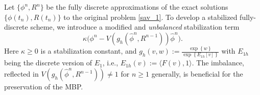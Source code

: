 \documentclass{m2an}
\begin{document}
Let $ \{ \phi^n, R^n \} $ be the fully discrete approximations of the exact solutions $ \{ \phi( t_{n} ), R( t_n ) \} $ to the original problem \eqref{sav_1}. To develop a stabilized fully-discrete scheme, we introduce a modified and \textit{unbalanced} stabilization term
\begin{equation}\label{def:ST}
	\kappa \big( \phi^{n} - V ( g_h(\hat{\phi}^{n}, R^{n-1}) ) \hat{\phi}^{n} \big).
\end{equation}
Here $ \kappa \geq 0 $ is a stabilization constant, and $ g_h(v, w):= \frac{\exp \left\{w\right\}}{ \exp \left\{E_{1h}[v]\right\} } $ with $E_{1 h}$ being the discrete version of $E_1$, i.e., $E_{1 h}(v):=\langle F(v), 1\rangle$. The imbalance, reflected in $ V ( g_h(\hat{\phi}^{n}, R^{n-1}) ) \neq 1 $ for $ n \geq 1 $ generally, is beneficial for the preservation of the MBP.
\end{document}

